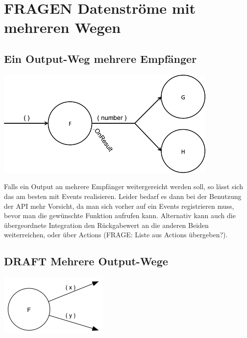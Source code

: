 \documentclass[a4paper,12pt,oneside]{book}
\begin{document}
\section{FRAGEN Datenströme mit mehreren Wegen}
\label{sec-4-4}
\subsection{Ein Output-Weg mehrere Empfänger}
\label{sec-4-4-1}
\includegraphics[width=.9\linewidth]{./img/diagramOut1to2.png}

Falls ein Output an mehrere Empfänger weitergereicht werden soll, so lässt sich das am besten mit Events realisieren.
Leider bedarf es dann bei der Benutzung der API mehr Vorsicht, da man sich vorher auf ein Events registrieren muss, bevor man
die gewünschte Funktion aufrufen kann.
Alternativ kann auch die übergeordnete Integration den Rückgabewert an die
anderen Beiden weiterreichen, oder über Actions (FRAGE: Liste aus Actions
übergeben?).

\subsection{DRAFT Mehrere Output-Wege}
\label{sec-4-4-2}

\includegraphics[width=.9\linewidth]{./img/diagramOut2.png}
\end{document}
